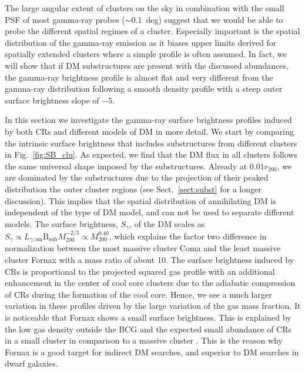 \documentclass[10pt,aps,pra,reprint,amsmath,amsfonts,amssymb,showpacs,nofootinbib,floatfix]{revtex4-1}
\newcommand{\rmn}{\mathrm}
\newcommand{\B}{\rmn{B}}
\newcommand{\bsub}{\B_\rmn{sub}}
\newcommand{\rvir}{r_{200}}
\newcommand{\mvir}{M_{200}}
\begin{document}
The large angular extent of clusters on the sky in combination with
the small PSF of most gamma-ray probes ($\sim 0.1$~deg) suggest that
we would be able to probe the different spatial regimes of a
cluster. Especially important is the spatial distribution of the
gamma-ray emission as it biases upper limits derived for spatially
extended clusters where a simple profile is often assumed. In fact, we
will show that if DM substructures are present with the discussed
abundances, the gamma-ray brightness profile is almost flat and very
different from the gamma-ray distribution following a smooth density
profile with a steep outer surface brightness slope of $-5$.

In this section we investigate the gamma-ray surface brightness
profiles induced by both CRs and different models of DM in more
detail. We start by comparing the intrinsic surface brightness that
includes substructures from different clusters in
Fig.~\ref{fig:SB_clu}. As expected, we find that the DM flux in all
clusters follows the same universal shape imposed by the
substructures. Already at $0.01\rvir$, we are dominated by the
substructures due to the projection of their peaked distribution the
outer cluster regions (see Sect.~\ref{sect:subst} for a longer
discussion). This implies that the spatial distribution of
annihilating DM is independent of the type of DM model, and can not be
used to separate different models. The surface brightness, $S_\gamma$,
of the DM scales as $S_\gamma\propto
L_{\gamma,\rmn{sm}}\bsub\mvir^{-2/3} \propto \mvir^{0.40}$, which
explains the factor two difference in normalization between the most
massive cluster Coma and the least massive cluster Fornax with a mass
ratio of about 10. The surface brightness induced by CRs is
proportional to the projected squared gas profile with an additional
enhancement in the center of cool core clusters due to the adiabatic
compression of CRs during the formation of the cool core. Hence, we
see a much larger variation in these profiles driven by the large
variation of the gas mass fraction. It is noticeable that Fornax shows
a small surface brightness. This is explained by the low gas density
outside the BCG and the expected small abundance of CRs in a small
cluster in comparison to a massive cluster
\cite{2010MNRAS.409..449P}. This is the reason why Fornax is a good
target for indirect DM searches, and superior to DM searches in dwarf
galaxies.
\end{document}

